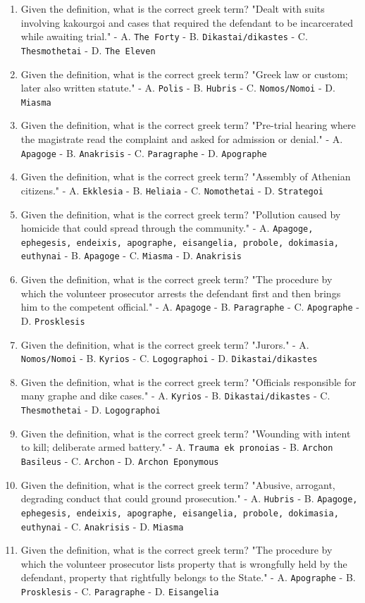 \documentclass[11pt]{article}
\begin{document}
\begin{enumerate}
\item Given the definition, what is the correct greek term? "Dealt with suits involving kakourgoi and cases that required the defendant to be incarcerated while awaiting trial." - A. \texttt{The Forty} - B. \texttt{Dikastai/dikastes} - C. \texttt{Thesmothetai} - D. \texttt{The Eleven}
\item Given the definition, what is the correct greek term? "Greek law or custom; later also written statute." - A. \texttt{Polis} - B. \texttt{Hubris} - C. \texttt{Nomos/Nomoi} - D. \texttt{Miasma}
\item Given the definition, what is the correct greek term? "Pre-trial hearing where the magistrate read the complaint and asked for admission or denial." - A. \texttt{Apagoge} - B. \texttt{Anakrisis} - C. \texttt{Paragraphe} - D. \texttt{Apographe}
\item Given the definition, what is the correct greek term? "Assembly of Athenian citizens." - A. \texttt{Ekklesia} - B. \texttt{Heliaia} - C. \texttt{Nomothetai} - D. \texttt{Strategoi}
\item Given the definition, what is the correct greek term? "Pollution caused by homicide that could spread through the community." - A. \texttt{Apagoge, ephegesis, endeixis, apographe, eisangelia, probole, dokimasia, euthynai} - B. \texttt{Apagoge} - C. \texttt{Miasma} - D. \texttt{Anakrisis}
\item Given the definition, what is the correct greek term? "The procedure by which the volunteer prosecutor arrests the defendant first and then brings him to the competent official." - A. \texttt{Apagoge} - B. \texttt{Paragraphe} - C. \texttt{Apographe} - D. \texttt{Prosklesis}
\item Given the definition, what is the correct greek term? "Jurors." - A. \texttt{Nomos/Nomoi} - B. \texttt{Kyrios} - C. \texttt{Logographoi} - D. \texttt{Dikastai/dikastes}
\item Given the definition, what is the correct greek term? "Officials responsible for many graphe and dike cases." - A. \texttt{Kyrios} - B. \texttt{Dikastai/dikastes} - C. \texttt{Thesmothetai} - D. \texttt{Logographoi}
\item Given the definition, what is the correct greek term? "Wounding with intent to kill; deliberate armed battery." - A. \texttt{Trauma ek pronoias} - B. \texttt{Archon Basileus} - C. \texttt{Archon} - D. \texttt{Archon Eponymous}
\item Given the definition, what is the correct greek term? "Abusive, arrogant, degrading conduct that could ground prosecution." - A. \texttt{Hubris} - B. \texttt{Apagoge, ephegesis, endeixis, apographe, eisangelia, probole, dokimasia, euthynai} - C. \texttt{Anakrisis} - D. \texttt{Miasma}
\item Given the definition, what is the correct greek term? "The procedure by which the volunteer prosecutor lists property that is wrongfully held by the defendant, property that rightfully belongs to the State." - A. \texttt{Apographe} - B. \texttt{Prosklesis} - C. \texttt{Paragraphe} - D. \texttt{Eisangelia}
\end{enumerate}
\end{document}
